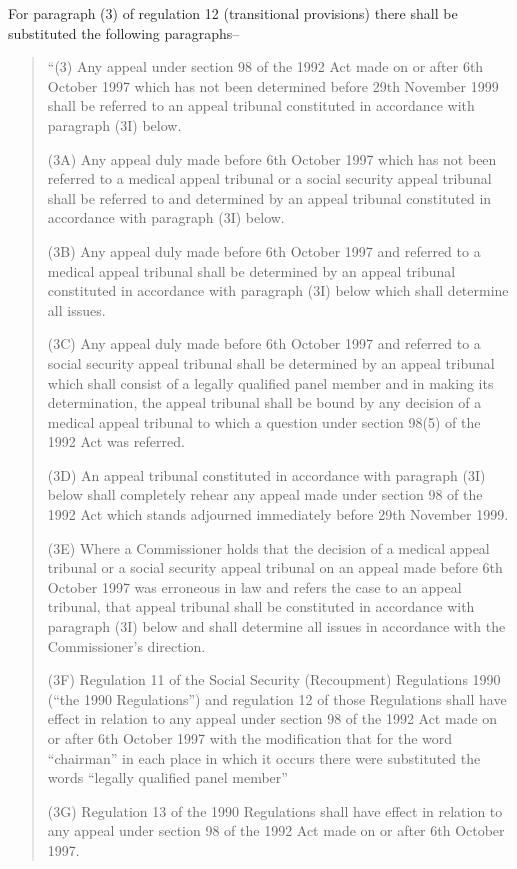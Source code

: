 \documentclass[12pt,a4paper]{article}
\begin{document}
For paragraph (3) of regulation 12 (transitional provisions) there shall be substituted the following paragraphs–
\begin{quotation}
“(3) Any appeal under section 98 of the 1992 Act made on or after 6th October 1997 which has not been determined before 29th November 1999 shall be referred to an appeal tribunal constituted in accordance with paragraph (3I) below.

(3A) Any appeal duly made before 6th October 1997 which has not been referred to a medical appeal tribunal or a social security appeal tribunal shall be referred to and determined by an appeal tribunal constituted in accordance with paragraph (3I) below.

(3B) Any appeal duly made before 6th October 1997 and referred to a medical appeal tribunal shall be determined by an appeal tribunal constituted in accordance with paragraph (3I) below which shall determine all issues.

(3C) Any appeal duly made before 6th October 1997 and referred to a social security appeal tribunal shall be determined by an appeal tribunal which shall consist of a legally qualified panel member and in making its determination, the appeal tribunal shall be bound by any decision of a medical appeal tribunal to which a question under section 98(5) of the 1992 Act was referred.

(3D) An appeal tribunal constituted in accordance with paragraph (3I) below shall completely rehear any appeal made under section 98 of the 1992 Act which stands adjourned immediately before 29th November 1999.

(3E) Where a Commissioner holds that the decision of a medical appeal tribunal or a social security appeal tribunal on an appeal made before 6th October 1997 was erroneous in law and refers the case to an appeal tribunal, that appeal tribunal shall be constituted in accordance with paragraph (3I) below and shall determine all issues in accordance with the Commissioner’s direction.

(3F) Regulation 11 of the Social Security (Recoupment) Regulations 1990 (“the 1990 Regulations”) and regulation 12 of those Regulations shall have effect in relation to any appeal under section 98 of the 1992 Act made on or after 6th October 1997 with the modification that for the word “chairman” in each place in which it occurs there were substituted the words “legally qualified panel member”

(3G) Regulation 13 of the 1990 Regulations shall have effect in relation to any appeal under section 98 of the 1992 Act made on or after 6th October 1997.


\end{quotation}
\end{document}
